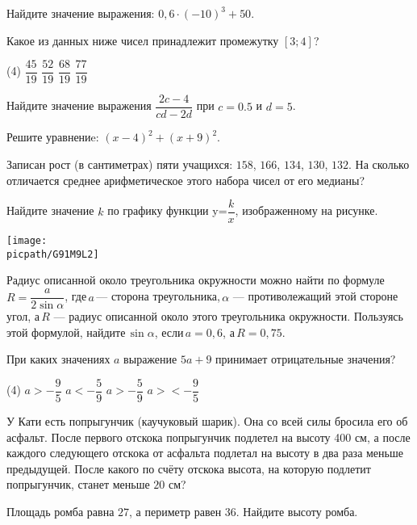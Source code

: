 \begin{class}[number=2]
	\begin{listofex}
		\item Найдите значение выражения: \(0,6\cdot(-10)^3+50\).
		\item Какое из данных ниже чисел принадлежит промежутку \( [3;4] \)?
		\begin{tasks}(4)
			\task \( \dfrac{45}{19} \)
			\task \( \dfrac{52}{19} \)
			\task \( \dfrac{68}{19} \)
			\task \( \dfrac{77}{19} \)
		\end{tasks}
		\item Найдите значение выражения \( \dfrac{2c-4}{cd-2d} \) при \( c=0.5 \) и \(d=5 \).
		\item Решите уравнениe: \((x-4)^2+(x+9)^2\).
		\item Записан рост (в сантиметрах) пяти учащихся: \( 158 \), \( 166 \), \( 134 \), \( 130 \), \( 132 \). На сколько отличается среднее арифметическое этого набора чисел от его медианы?
		\item Найдите значение \( k \) по графику функции y=\(\dfrac{k}{x}\),  изображенному на рисунке.
		\begin{center}
			\texttt{[image: \\picpath/G91M9L2]}
		\end{center}
		\item Радиус описанной около треугольника окружности можно найти по формуле \( R=\dfrac{a}{2\sin\alpha} \),  где \( a \) --- сторона треугольника, \( \alpha \) --- противолежащий этой стороне угол, а \( R \) --- радиус описанной около этого треугольника окружности. Пользуясь этой формулой, найдите \( \sin\alpha \), если \( a=0,6 \), а \( R=0,75 \).
		\item При каких значениях \( a \) выражение \( 5a+9 \) принимает отрицательные значения?
		\begin{tasks}(4)
			\task \( a>-\dfrac{9}{5} \)
			\task \( a<-\dfrac{5}{9} \)
			\task \( a>-\dfrac{5}{9} \)
			\task \( a><-\dfrac{9}{5} \)
		\end{tasks}
		\item У Кати есть попрыгунчик (каучуковый шарик). Она со всей силы бросила его об асфальт. После первого отскока попрыгунчик подлетел на высоту 400 см, а после каждого следующего отскока от асфальта подлетал на высоту в два раза меньше предыдущей. После какого по счёту отскока высота, на которую подлетит попрыгунчик, станет меньше \( 20 \) см?
		\item Площадь ромба равна \( 27 \), а периметр равен \( 36 \). Найдите высоту ромба.

\end{listofex}
\end{class}
